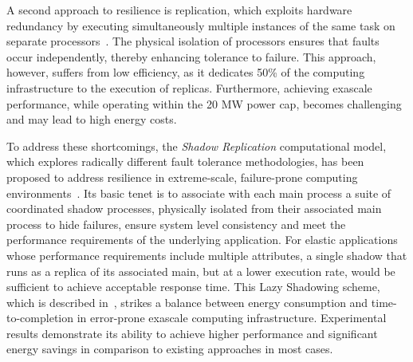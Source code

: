A second approach to resilience is replication, which exploits hardware redundancy by executing simultaneously multiple instances of the same task on separate processors~\cite{bartlett_1981_nonstop}. The physical isolation of processors ensures that faults occur independently, thereby enhancing tolerance to failure. This approach, however, suffers from low efficiency, as it dedicates 50\% of the computing infrastructure to the execution of replicas. Furthermore, achieving exascale performance, while operating within the 20 MW power cap, becomes challenging and may lead to high energy costs. 


To address these shortcomings, the {\it Shadow Replication} computational model, which explores radically different fault tolerance methodologies, has been proposed to address resilience in extreme-scale, failure-prone computing environments~\cite{mills2014power}. Its basic tenet is to associate with each main process a suite of coordinated shadow processes, physically isolated from their associated main process to hide failures, ensure system level consistency and meet the performance requirements of the underlying application. 
For elastic applications whose performance requirements include multiple attributes, 
a single shadow that runs as a replica of its associated main, but at a lower execution rate, would be sufficient to achieve acceptable response time. 
This Lazy Shadowing scheme, which is described in~\cite{cui_2016_scalcom}, strikes a balance between energy consumption and time-to-completion in error-prone exascale computing infrastructure. Experimental results demonstrate its ability to achieve higher performance and significant energy savings in comparison to existing approaches in most cases. 

